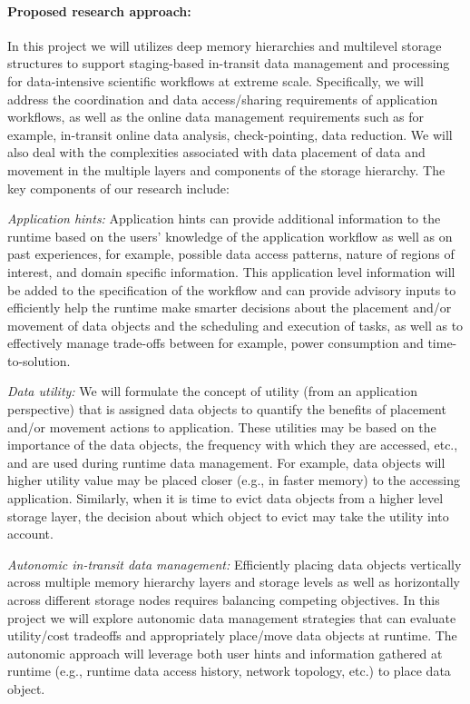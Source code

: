 \paragraph{Proposed research approach:} In this project we will utilizes
deep memory hierarchies and multilevel storage structures to support
staging-based in-transit data management and processing for data-intensive
scientific workflows at extreme scale. Specifically, we will address the
coordination and data access/sharing requirements of application workflows,
as well as the online data management requirements such as for example,
in-transit online data analysis, check-pointing, data reduction. We will
also deal with the complexities associated with data placement of data and
movement in the multiple layers and components of the storage hierarchy. The
key components of our research include:

{\em Application hints:} Application hints can provide additional
information to the runtime based on the users' knowledge of the application
workflow as well as on past experiences, for example, possible data access
patterns, nature of regions of interest, and domain specific information.
This application level information will be added to the specification of the
workflow and can provide advisory inputs to efficiently help the runtime
make smarter decisions about the placement and/or movement of data objects
and the scheduling and execution of tasks, as well as to effectively manage
trade-offs between for example, power consumption and time-to-solution.

{\em Data utility:} We will formulate the concept of utility (from an
application perspective) that is assigned data objects to quantify the
benefits of placement and/or movement actions to application. These
utilities may be based on the importance of the data objects, the frequency
with which they are accessed, etc., and are used during runtime data
management. For example, data objects will higher utility value may be
placed closer (e.g., in faster memory) to the accessing application.
Similarly, when it is time to evict data objects from a higher level storage
layer, the decision about which object to evict may take the utility into
account.

{\em Autonomic in-transit data management:} Efficiently placing data objects
vertically across multiple memory hierarchy layers and storage levels as
well as horizontally across different storage nodes requires balancing
competing objectives. In this project we will explore autonomic data
management strategies that can evaluate utility/cost tradeoffs and
appropriately place/move data objects at runtime. The autonomic approach
will leverage both user hints and information gathered at runtime (e.g.,
runtime data access history, network topology, etc.) to place data object.

